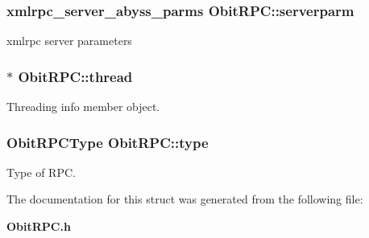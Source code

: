 \subsubsection{\setlength{\rightskip}{0pt plus 5cm}xmlrpc\_\-server\_\-abyss\_\-parms {\bf Obit\-RPC::serverparm}}\label{structObitRPC_o8}


xmlrpc server parameters 

\subsubsection{$\ast$ {\bf Obit\-RPC::thread}}\label{structObitRPC_o4}


Threading info member object. 

\subsubsection{\setlength{\rightskip}{0pt plus 5cm}Obit\-RPCType {\bf Obit\-RPC::type}}\label{structObitRPC_o5}


Type of RPC. 



The documentation for this struct was generated from the following file:\begin{CompactItemize}
\item 
{\bf Obit\-RPC.h}\end{CompactItemize}
